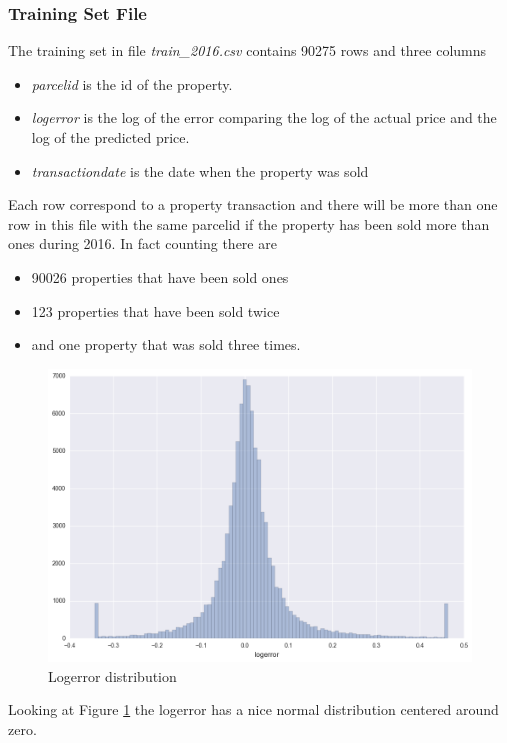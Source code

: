 \documentclass[a4paper]{article}
\begin{document}
\subsubsection{Training Set File}
The training set in file \textit{train\_2016.csv} contains 90275 rows and three columns
\begin{itemize}
    \item \textit{parcelid} is the id of the property.
    \item \textit{logerror} is the log of the error comparing the log of the actual price and the log of the predicted price.
    \item \textit{transactiondate} is the date when the property was sold
\end{itemize}

Each row correspond to a property transaction and there will be more than one row in this file with the same parcelid if the property has been sold more than ones during 2016. In fact counting there are
\begin{itemize}
    \item 90026 properties that have been sold ones
    \item 123 properties that have been sold twice
    \item and one property that was sold three times.
\end{itemize}

\begin{figure}
\centering
\includegraphics[width=1\textwidth]{./img/train-logerror.png}
\caption{\label{fig:logerror}Logerror distribution}
\end{figure}
Looking at Figure \ref{fig:logerror} the logerror has a nice normal distribution centered around zero.
\end{document}
